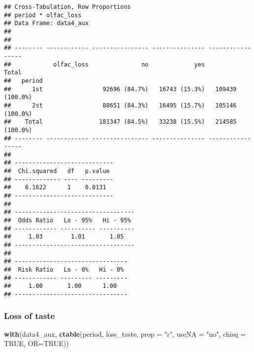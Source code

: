 \documentclass[
]{article}
\newenvironment{Shaded}{\begin{snugshade}}{\end{snugshade}}
\newcommand{\DataTypeTok}[1]{\textcolor[rgb]{0.13,0.29,0.53}{#1}}
\newcommand{\KeywordTok}[1]{\textcolor[rgb]{0.13,0.29,0.53}{\textbf{#1}}}
\newcommand{\NormalTok}[1]{#1}
\newcommand{\OtherTok}[1]{\textcolor[rgb]{0.56,0.35,0.01}{#1}}
\newcommand{\StringTok}[1]{\textcolor[rgb]{0.31,0.60,0.02}{#1}}
\begin{document}
\begin{verbatim}
## Cross-Tabulation, Row Proportions  
## period * olfac_loss  
## Data Frame: data4_aux  
## 
## 
## -------- ------------ ---------------- --------------- -----------------
##            olfac_loss               no             yes             Total
##   period                                                                
##      1st                 92696 (84.7%)   16743 (15.3%)   109439 (100.0%)
##      2st                 88651 (84.3%)   16495 (15.7%)   105146 (100.0%)
##    Total                181347 (84.5%)   33238 (15.5%)   214585 (100.0%)
## -------- ------------ ---------------- --------------- -----------------
## 
## ----------------------------
##  Chi.squared   df   p.value 
## ------------- ---- ---------
##    6.1622      1    0.0131  
## ----------------------------
## 
## ----------------------------------
##  Odds Ratio   Lo - 95%   Hi - 95% 
## ------------ ---------- ----------
##     1.03        1.01       1.05   
## ----------------------------------
## 
## --------------------------------
##  Risk Ratio   Lo - 0%   Hi - 0% 
## ------------ --------- ---------
##     1.00       1.00      1.00   
## --------------------------------
\end{verbatim}

\hypertarget{loss-of-taste}{%
\subsubsection{Loss of taste}\label{loss-of-taste}}

\begin{Shaded}
\begin{Highlighting}[]
\KeywordTok{with}\NormalTok{(data4_aux, }\KeywordTok{ctable}\NormalTok{(period, loss_taste, }\DataTypeTok{prop =} \StringTok{"r"}\NormalTok{, }\DataTypeTok{useNA =} \StringTok{"no"}\NormalTok{, }\DataTypeTok{chisq =} \OtherTok{TRUE}\NormalTok{, }\DataTypeTok{OR=}\OtherTok{TRUE}\NormalTok{))}
\end{Highlighting}
\end{Shaded}
\end{document}
